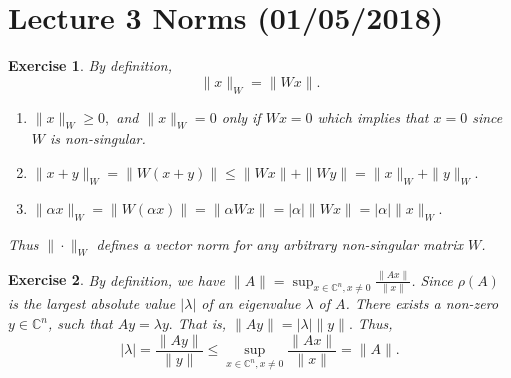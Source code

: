 \documentclass[paper=a4, fontsize=11pt]{scrartcl} %
\numberwithin{equation}{section} %
\numberwithin{figure}{section} %
\numberwithin{table}{section} %
\newtheorem{exercise}{Exercise}
\numberwithin{exercise}{section}
\begin{document}
\section{Lecture 3 Norms (01/05/2018)}
\begin{exercise}
By definition,
$$\|x\|_{W}=\|Wx\|.$$
\begin{enumerate}
\item $\|x\|_{W}\geq 0,$ and $\|x\|_{W}=0$ only if $Wx=0$ which implies that $x=0$ since $W$ is non-singular.
\item $\|x+y\|_{W}=\|W(x+y)\|\leq \|Wx\|+\|Wy\|=\|x\|_{W}+\|y\|_{W}.$
\item $\|\alpha x\|_{W}=\|W(\alpha x)\|=\|\alpha Wx\|=|\alpha|\|Wx\|=|\alpha|\|x\|_{W}.$
\end{enumerate}
Thus $\|\cdot\|_{W}$ defines a vector norm for any arbitrary non-singular matrix $W$.
\end{exercise}
\begin{exercise}
By definition, we have
$\|A\|=\sup_{x \in\mathbb{C}^n,x\neq 0 } \frac{\|Ax\|}{\|x\|}$.
Since $\rho(A)$ is the largest absolute value $|\lambda|$ of an eigenvalue $\lambda$ of $A$. There exists a non-zero $y\in\mathbb{C}^n$, such that $Ay=\lambda y.$
That is, $\|Ay\|=|\lambda | \|y\|.$  Thus,
$$|\lambda |=\frac{\|Ay\|}{\|y\|} \leq \sup_{x \in\mathbb{C}^n,x\neq 0 } \frac{\|Ax\|}{\|x\|}=\|A\|.$$
\end{exercise}
\end{document}
